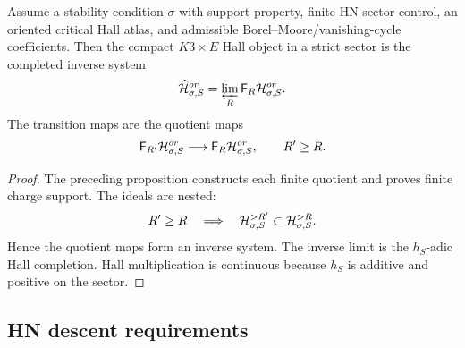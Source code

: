 \begin{theorem}
\label{thm:correct-finite-first-object}
Assume a stability condition \(\sigma\) with support property, finite
HN-sector control, an oriented critical Hall atlas, and admissible
Borel--Moore/vanishing-cycle coefficients.  Then the compact
\(K3\times E\) Hall object in a strict sector is the completed inverse
system
\[
  \widehat{\mathcal H}_{\sigma,S}^{or}
  =
  \varprojlim_R
  \mathsf F_R\mathcal H_{\sigma,S}^{or}.
\]
The transition maps are the quotient maps
\[
  \mathsf F_{R'}\mathcal H_{\sigma,S}^{or}
  \longrightarrow
  \mathsf F_R\mathcal H_{\sigma,S}^{or},
  \qquad R'\ge R.
\]
\end{theorem}

\begin{proof}
The preceding proposition constructs each finite quotient and proves
finite charge support.  The ideals are nested:
\[
  R'\ge R\quad\Longrightarrow\quad
  \mathcal H_{\sigma,S}^{>R'}\subset\mathcal H_{\sigma,S}^{>R}.
\]
Hence the quotient maps form an inverse system.  The inverse limit is
the \(h_S\)-adic Hall completion.  Hall multiplication is continuous
because \(h_S\) is additive and positive on the sector.
\end{proof}

\subsection{HN descent requirements}

